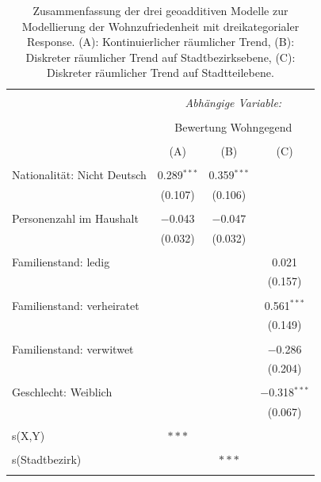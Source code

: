 \documentclass{Vorlage}
\begin{document}
\begin{appendix}
\begin{table}[h] \centering 
  \caption{Zusammenfassung der drei geoadditiven Modelle zur Modellierung der Wohnzufriedenheit mit dreikategorialer Response. (A): Kontinuierlicher räumlicher Trend, (B): Diskreter räumlicher Trend auf Stadtbezirksebene, (C): Diskreter räumlicher Trend auf Stadtteilebene.} 
  \label{ParameterTabW5spat} 
\begin{tabular}{@{\extracolsep{5pt}}lccc} 
\\[-1.8ex]\hline 
\hline \\[-1.8ex] 
 & \multicolumn{3}{c}{\textit{Abhängige Variable:}} \\ 
\cline{2-4} 
\\[-1.8ex] & \multicolumn{3}{c}{Bewertung Wohngegend} \\ 
\\[-1.8ex] & (A) & (B) & (C)\\ 
\hline \\[-1.8ex] 
 Nationalität: Nicht Deutsch & 0.289$^{***}$ & 0.359$^{***}$ &  \\ 
  & (0.107) & (0.106) &  \\ 
  & & & \\ 
 Personenzahl im Haushalt & $-$0.043 & $-$0.047 &  \\ 
  & (0.032) & (0.032) &  \\ 
  & & & \\ 
 Familienstand: ledig &  &  & 0.021 \\ 
  &  &  & (0.157) \\ 
  & & & \\ 
 Familienstand: verheiratet &  &  & 0.561$^{***}$ \\ 
  &  &  & (0.149) \\ 
  & & & \\ 
 Familienstand: verwitwet &  &  & $-$0.286 \\ 
  &  &  & (0.204) \\ 
  & & & \\ 
 Geschlecht: Weiblich &  &  & $-$0.318$^{***}$ \\ 
  &  &  & (0.067) \\ \hline
   & & & \\ 
 s(X,Y) & $***$ &  &  \\ 
  & & & \\ 
 s(Stadtbezirk)&  & $***$ &  \\ 
  & & & \\ 

\end{tabular}
\end{table}
\end{appendix}
\end{document}
